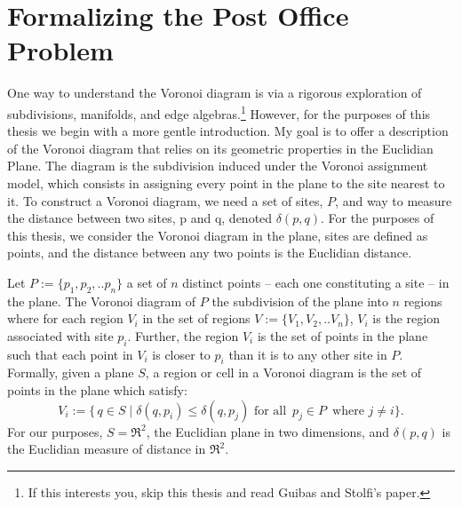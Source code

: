 \documentclass[12pt,twoside]{reedthesis}
\begin{document}
  \section{Formalizing the Post Office Problem} %
  \label{sec:formalizing_the_post_office_problem}
    One way to understand the Voronoi diagram is via a rigorous exploration of subdivisions, manifolds, and edge algebras.\footnote{If this interests you, skip this thesis and read Guibas and Stolfi's paper.\citep{}} However,  for the purposes of this thesis we begin with a more gentle introduction. My goal is to offer a description of the Voronoi diagram that relies on its geometric properties in the Euclidian Plane. The diagram is the subdivision induced under the Voronoi assignment model, which consists in assigning every point in the plane to the site nearest to it. To construct a Voronoi diagram, we need a set of sites, $P$, and way to measure the distance between two sites, p and q, denoted $\delta(p,q)$. For the purposes of this thesis, we consider the Voronoi diagram in the plane, sites are defined as points, and the distance between any two points is the Euclidian distance.\par
    Let $P:=\{p_{1}, p_{2}, .. p_{n}\}$ a set of $n$ distinct points -- each one constituting a site -- in the plane. The Voronoi diagram of $P$ the subdivision of the plane into $n$ regions where for each region $V_{i}$ in the set of regions $V:=\{V_{1}, V_{2}, .. V_{n}\}$, $V_{i}$ is the region associated with site $p_{i}$. Further, the region $V_{i}$ is the set of points in the plane such that each point in $V_{i}$ is closer to $p_{i}$ than it is to any other site in $P$. Formally, given a plane $S$, a region or cell in a Voronoi diagram is the set of points in the plane which satisfy:
    $$V_{i} := \{\,q \in S \mid \delta(q, p_{i}) \leq \delta(q, p_{j}) \text{ for all }\, p_{j}\in P\,\text{ where }j\neq i \}.$$
    For our purposes, $S= \Re^2$, the Euclidian plane in two dimensions, and $\delta(p, q)$ is the Euclidian measure of distance in $\Re^2$. \par
\end{document}
